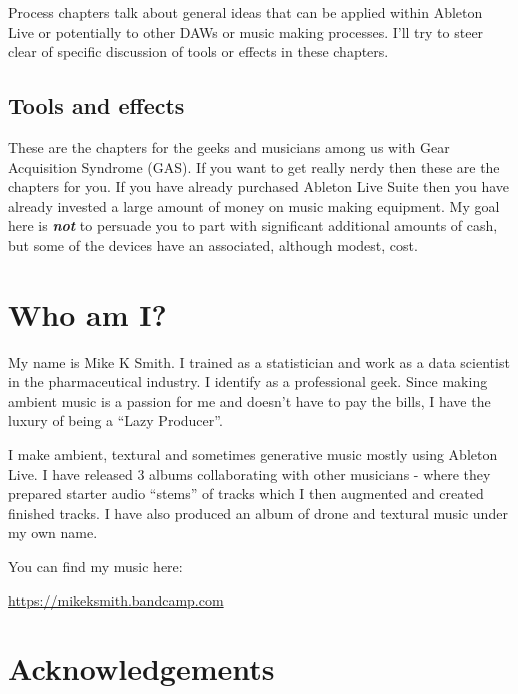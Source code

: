 \documentclass[
  12pt,
  letterpaper,
  oneside,
  open=any]{scrbook}
\begin{document}
Process chapters talk about general ideas that can be applied within
Ableton Live or potentially to other DAWs or music making processes.
I'll try to steer clear of specific discussion of tools or effects in
these chapters.

\subsection*{Tools and effects}\label{tools-and-effects}

These are the chapters for the geeks and musicians among us with Gear
Acquisition Syndrome (GAS). If you want to get really nerdy then these
are the chapters for you. If you have already purchased Ableton Live
Suite then you have already invested a large amount of money on music
making equipment. My goal here is \textbf{\emph{not}} to persuade you to
part with significant additional amounts of cash, but some of the
devices have an associated, although modest, cost.

\section*{Who am I?}\label{who-am-i}


My name is Mike K Smith. I trained as a statistician and work as a data
scientist in the pharmaceutical industry. I identify as a professional
geek. Since making ambient music is a passion for me and doesn't have to
pay the bills, I have the luxury of being a ``Lazy Producer''.

I make ambient, textural and sometimes generative music mostly using
Ableton Live. I have released 3 albums collaborating with other
musicians - where they prepared starter audio ``stems'' of tracks which
I then augmented and created finished tracks. I have also produced an
album of drone and textural music under my own name.

You can find my music here:

\url{https://mikeksmith.bandcamp.com}

\section*{Acknowledgements}\label{acknowledgements}

\end{document}
